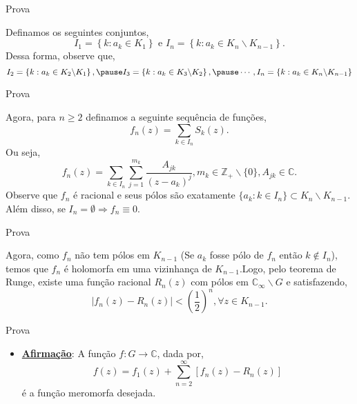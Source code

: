 \documentclass{libs/ufc_format}
\begin{document}
\begin{frame}{Prova}
\begin{prova}
Definamos os seguintes conjuntos, 
$$I_{1}=\left \lbrace k:a_{k}\in K_{1}\right \rbrace \text{ e } I_{n}=\left \lbrace k: a_{k}\in K_{n}\backslash K_{n-1}\right \rbrace.$$ \pause
Dessa forma, observe que, \\
$$I_{2}=\left \lbrace k: a_{k}\in K_{2}\backslash K_{1}\right \rbrace , \pause
I_{3}=\left \lbrace k: a_{k}\in K_{3}\backslash K_{2}\right \rbrace ,\pause
\cdots ,
I_{n}=\left \lbrace k: a_{k}\in K_{n}\backslash K_{n-1}\right \rbrace$$

\end{prova}
\end{frame}
\begin{frame}{Prova}
\begin{prova}
Agora, para $n\geq 2$ definamos a seguinte sequência de funções, \pause
$$f_{n}\left(z\right)= \sum_{k\in I_{n}}S_{k}\left(z\right).$$
Ou seja, \pause
$$f_{n}\left(z\right)= \sum_{k\in I_{n}}\sum_{j=1}^{m_{k}}\frac{A_{jk}}{\left(z-a_{k}\right)^{j}}, m_{k}\in \mathbb{Z}_{+} \backslash \{0\}, A_{jk}\in \mathbb{C}.$$
\pause
Observe que $f_{n}$ é racional e seus pólos são exatamente $\{a_{k}: k\in I_{n}\}\subset K_{n}\backslash K_{n-1}$. \\
\pause
Além disso, se $I_{n}=\emptyset \Rightarrow f_{n}\equiv 0$.
\end{prova}
\end{frame}

\begin{frame}{Prova}
\begin{prova}
Agora, como $f_{n}$ não tem pólos em $K_{n-1}$ (Se $a_{k}$ fosse pólo de $f_{n}$ então $k\notin I_{n}$), temos que $f_{n}$ é holomorfa em uma vizinhança de $K_{n-1}$.\pause  Logo, pelo teorema de Runge, existe uma função racional $R_{n}\left(z\right)$ com pólos em $\mathbb{C}_{\infty}\backslash G$ e satisfazendo, \pause
$$|f_{n}\left(z\right)-R_{n}\left(z\right)|<\left(\frac{1}{2}\right)^{n}, \forall z \in K_{n-1}.$$

\end{prova}
\end{frame}

\begin{frame}{Prova}
\begin{prova}
\begin{itemize}
 \item \textbf{\uline{Afirmação}}: A função $f:G\longrightarrow \mathbb{C}$, dada por,\\
 $$f\left(z\right) = f_{1}\left(z\right) + \sum_{n=2}^{\infty}\left[f_n\left(z\right) - R_n\left(z\right)\right]$$
 é a função meromorfa desejada. \\
  \end{itemize}
\end{prova}
\end{frame}
\end{document}
